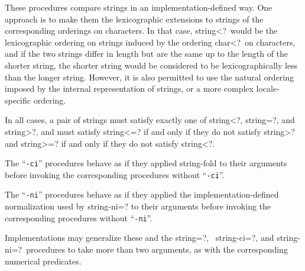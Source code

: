 \begin{entry}{%
}

These procedures compare strings in an implementation-defined way.
One approach is to make them the lexicographic extensions to strings of
the corresponding orderings on characters.  In that case, {\cf string<?}\
would be the lexicographic ordering on strings induced by the ordering
{\cf char<?}\ on characters, and if the two strings differ in length but
are the same up to the length of the shorter string, the shorter string
would be considered to be lexicographically less than the longer string.
However, it is also permitted to use the natural ordering imposed by the
internal representation of strings, or a more complex locale-specific
ordering.

In all cases, a pair of strings must satisfy exactly one of
{\cf string<?}, {\cf string=?}, and {\cf string>?}, and must satisfy
{\cf string<=?} if and only if they do not satisfy {\cf string>?} and
{\cf string>=?} if and only if they do not satisfy {\cf string<?}.

The \hbox{``{\tt -ci}''} procedures behave as if they applied
{\cf string-fold} to their arguments before invoking the corresponding
procedures without  \hbox{``{\tt -ci}''}.

The \hbox{``{\tt -ni}''} procedures behave as if they applied the
implementation-defined normalization used by {\cf string-ni=?}
to their arguments before
invoking the corresponding procedures without \hbox{``{\tt -ni}''}.

Implementations may generalize these and the {\cf string=?},\ {\cf
  string-ci=?}, and {\cf string-ni=?}\ procedures to take more than
two arguments, as with the corresponding numerical predicates.

\end{entry}

